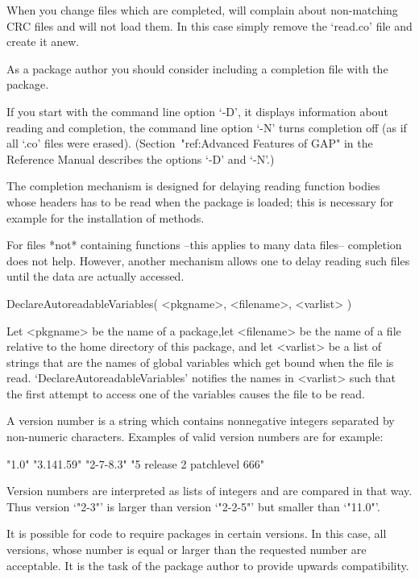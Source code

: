 When you change files which are completed, {\GAP} will complain about
non-matching CRC files and will not load them.
In this case simply remove the `read.co' file and create it anew.

As a {\GAP} package author you should consider including a completion file
with the package.

If you start {\GAP} with the command line option `-D', it displays
information about reading and completion, the command line option `-N' turns
completion off (as if all `.co' files were erased).
(Section~"ref:Advanced Features of GAP" in the {\GAP} Reference Manual
describes the options `-D' and `-N'.)



The completion mechanism is designed for delaying reading function bodies
whose headers has to be read when the package is loaded;
this is necessary for example for the installation of methods.

For files *not* containing functions --this applies to many data files--
completion does not help.
However, another mechanism allows one to delay reading such files
until the data are actually accessed.

\>DeclareAutoreadableVariables( <pkgname>, <filename>, <varlist> )

Let <pkgname> be the name of a package,let <filename> be the name of
a file relative to the home directory of this package,
and let <varlist> be a list of strings that are the names of global
variables which get bound when the file is read.
`DeclareAutoreadableVariables' notifies the names in <varlist> such that
the first attempt to access one of the variables causes the file to be
read.



A version number is a string which contains nonnegative integers separated
by non-numeric characters. Examples of valid version numbers are for
example:

\begintt
"1.0"   "3.141.59"  "2-7-8.3" "5 release 2 patchlevel 666"
\endtt

Version numbers are interpreted as  lists of integers and are compared
in that way. Thus version `"2-3"' is larger than version `"2-2-5"' but
smaller than `"11.0"'.

It  is  possible  for  code  to require  {\GAP}  packages  in  certain
versions. In this case, all versions,  whose number is equal or larger
than  the requested  number  are acceptable.  It is  the  task of  the
package author to provide upwards compatibility.

